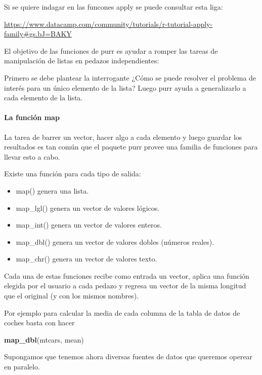 \documentclass[]{book}
\newenvironment{Shaded}{\begin{snugshade}}{\end{snugshade}}
\newcommand{\KeywordTok}[1]{\textcolor[rgb]{0.13,0.29,0.53}{\textbf{#1}}}
\newcommand{\NormalTok}[1]{#1}
\providecommand{\tightlist}{%
  \setlength{\itemsep}{0pt}\setlength{\parskip}{0pt}}
\let\oldparagraph\paragraph
\renewcommand{\paragraph}[1]{\oldparagraph{#1}\mbox{}}
\theoremstyle{definition}
\theoremstyle{definition}
\theoremstyle{definition}
\theoremstyle{remark}
\begin{document}
Si se quiere indagar en las funcones apply se puede consultar esta liga:

\url{https://www.datacamp.com/community/tutorials/r-tutorial-apply-family\#gs.bJ=BAKY}

El objetivo de las funciones de purr es ayudar a romper las tareas de
manipulación de listas en pedazos independientes:

Primero se debe plantear la interrogante ¿Cómo se puede resolver el
problema de interés para un único elemento de la lista? Luego purr ayuda
a generalizarlo a cada elemento de la lista.

\paragraph{La función map}\label{la-funcion-map}

La tarea de barrer un vector, hacer algo a cada elemento y luego guardar
los resultados es tan común que el paquete purr provee una familia de
funciones para llevar esto a cabo.

Existe una función para cada tipo de salida:

\begin{itemize}
\tightlist
\item
  map() genera una lista.
\item
  map\_lgl() genera un vector de valores lógicos.
\item
  map\_int() genera un vector de valores enteros.
\item
  map\_dbl() genera un vector de valores dobles (números reales).
\item
  map\_chr() genera un vector de valores texto.
\end{itemize}

Cada una de estas funciones recibe como entrada un vector, aplica una
función elegida por el usuario a cada pedazo y regresa un vector de la
misma longitud que el original (y con los mismos nombres).

Por ejemplo para calcular la media de cada columna de la tabla de datos
de coches basta con hacer

\begin{Shaded}
\begin{Highlighting}[]
\KeywordTok{map_dbl}\NormalTok{(mtcars, mean)}
\end{Highlighting}
\end{Shaded}

Supongamos que tenemos ahora diversas fuentes de datos que queremos
operear en paralelo.
\end{document}
